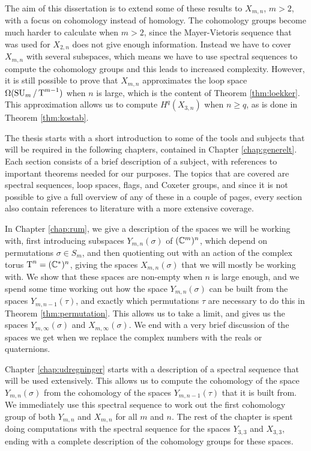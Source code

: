 The aim of this dissertation is to extend some of
these results to $X_{m,n}$, $m > 2$, with a focus on cohomology
instead of homology. The cohomology groups become much harder to
calculate when $m > 2$, since the Mayer-Vietoris sequence that was
used for $X_{2,n}$
does not give enough information. Instead we have to cover $X_{m,n}$
with several subspaces, which means we have to use spectral
sequences to compute the cohomology groups and this leads to increased
complexity. However, it is still possible to prove that $X_{m,n}$
approximates the loop space $\Omega(\operatorname{SU}_{m}/\operatorname{T}^{m-1})$ when $n$ is large, which
is the content of Theorem \ref{thm:loekker}. This approximation allows
us to compute $H^q(X_{3,n})$ when $n \geq q$, as is done in Theorem
\ref{thm:kostab}.

The thesis starts with a short introduction to some of the tools and
subjects that
will be required in the following chapters, contained in Chapter
\ref{chap:generelt}. Each section consists of a brief description of
a subject, with references to
important theorems needed for our purposes. The topics that are
covered are spectral
sequences, loop spaces, flags, and Coxeter groups, and since it is not
possible to give a full overview of any of these in a couple of
pages, every section also contain references to literature with a
more extensive coverage.

In Chapter \ref{chap:rum}, we give a description of the spaces we will
be working with, first introducing subspaces $Y_{m,n}(\sigma)$ of
$(\mathbb{C}^{m})^{n}$, which depend on permutations $\sigma\in S_m$, and
then quotienting out with an action of the complex torus $\operatorname{T}^n =
(\mathbb{C}^*)^n$, giving the spaces $X_{m,n}(\sigma)$ that we will mostly be
working with. We show that these spaces are non-empty when $n$ is
large enough, and we spend some time working out how the space
$Y_{m,n}(\sigma)$ can be built from the spaces $Y_{m,n-1}(\tau)$, and
exactly which permutations $\tau$ are necessary to do this in Theorem
\ref{thm:permutation}. This
allows us to take a limit, and gives us the spaces
$Y_{m,\infty}(\sigma)$ and $X_{m,\infty}(\sigma)$. We end
with a very brief discussion of the spaces we get when we replace the
complex numbers with the reals or quaternions.

Chapter \ref{chap:udregninger} starts with a description of a spectral
sequence that will be used extensively. This allows us to compute the
cohomology of the space $Y_{m,n}(\sigma)$ from the cohomology of the
spaces $Y_{m,n-1}(\tau)$ that it is built from. We immediately use
this spectral sequence to work out the first cohomology group of both
$Y_{m,n}$ and $X_{m,n}$ for all $m$ and $n$. The rest of the
chapter is spent doing computations with the spectral sequence for the
spaces $Y_{3,3}$ and
$X_{3,3}$, ending with a complete description of the cohomology
groups for these spaces.

